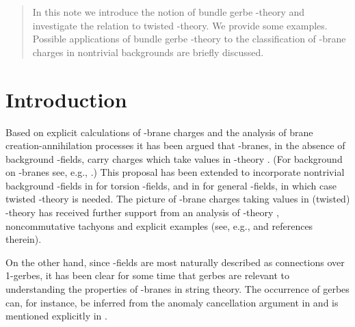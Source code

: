 \documentclass[a4paper,reqno]{amsart}
\theoremstyle{plain}
\theoremstyle{definition}
\theoremstyle{remark}
\numberwithin{equation}{section}
\numberwithin{figure}{section}
\providecommand{\<}{\langle}
\renewcommand{\>}{\rangle}
\begin{document}
\begin{abstract}
In this note we introduce the notion of bundle gerbe \coordHE{}-theory
and investigate the relation to twisted \coordHE{}-theory.  We provide
some examples.  Possible applications of bundle gerbe \coordHE{}-theory to
the classification of \coordHE{}-brane charges in nontrivial backgrounds are
briefly discussed.
\end{abstract}
\maketitle

\section{Introduction}

Based on explicit calculations of \coordHE{}-brane charges and the analysis of
brane creation-annihilation processes it has been argued that
\coordHE{}-branes, in the absence of background \coordHE{}-fields, carry charges which
take values in \coordHE{}-theory \cite{MM,Wit1,Hor,MW}.  (For background on
\coordHE{}-branes see, e.g., \cite{Pol}.)  This proposal has been extended
to incorporate nontrivial background \coordHE{}-fields in \cite{Wit1,Kap}
for torsion \coordHE{}-fields, and in \cite{BM,Ati2} for general \coordHE{}-fields,
in which case twisted \coordHE{}-theory \cite{Ros} is needed.
The picture of \coordHE{}-brane charges taking values in (twisted)
\coordHE{}-theory has received further support from an analysis of \coordHE{}-theory
\cite{DMW}, noncommutative tachyons \cite{Wit2,HM} and explicit
examples (see, e.g., \cite{FS} and references therein).

On the other hand, since \coordHE{}-fields are most naturally
described as connections over 1-gerbes,
it has been clear for some time that gerbes are relevant to
understanding the properties of \coordHE{}-branes in string theory.
The occurrence of gerbes
can, for instance, be inferred from the anomaly cancellation
argument in \cite{FW} and is mentioned explicitly in \cite{HM}.
\end{document}
